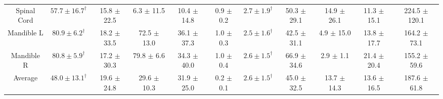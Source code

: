 \begin{table}[t!]
{\begin{subtable}{1\textwidth}
{\begin{tabular}{@{}ccccccccccc@{}}
Spinal Cord&$\bm{57.7\pm16.7}^\dagger$&15.8 $\pm$ 22.5&6.3 $\pm$ 11.5&10.4 $\pm$ 14.8&0.9 $\pm$ 0.2&$\bm{2.7\pm1.9}^\dagger$&50.3 $\pm$ 29.1&14.9 $\pm$ 26.1&11.3 $\pm$ 15.1&224.5 $\pm$ 120.1 \\
Mandible L&$\bm{80.9\pm6.2}^\dagger$&18.2 $\pm$ 33.5&72.5 $\pm$ 13.0&36.1 $\pm$ 37.3&1.0 $\pm$ 0.3&$\bm{2.5\pm1.6}^\dagger$&42.5 $\pm$ 31.1&4.9 $\pm$ 15.0&13.8 $\pm$ 17.7&164.2 $\pm$ 73.1 \\
Mandible R&$\bm{80.8\pm5.9}^\dagger$&17.2 $\pm$ 30.3&79.8 $\pm$ 6.6&34.3 $\pm$ 40.0&1.0 $\pm$ 0.4&$\bm{2.6\pm1.5}^\dagger$&66.9 $\pm$ 34.6&2.9 $\pm$ 1.1&21.4 $\pm$ 20.4&155.2 $\pm$ 59.6 \\ \hline
Average&$\bm{48.0\pm13.1}^\dagger$&19.6 $\pm$ 24.8&29.6 $\pm$ 10.3&31.9 $\pm$ 25.0&0.2 $\pm$ 0.1&$\bm{2.6\pm1.5}^\dagger$&45.0 $\pm$ 32.5&13.7 $\pm$ 14.3&13.6 $\pm$ 16.5&187.6 $\pm$ 61.8 \\
\bottomrule[1.5pt]
\end{tabular}}
\end{subtable}}

\vspace{0.2cm}


\end{table}
